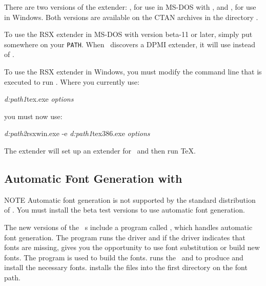 There are two versions of the extender: , for use in
MS-DOS with , and , for use in
Windows.  Both versions are available on the CTAN archives in the
directory .

To use the RSX extender in MS-DOS with 
version beta-11 or later, simply put  somewhere on
your \texttt{PATH}.  When \emTeX\ discovers a DPMI extender, it will
use  instead of .

\newpage
To use the RSX extender in Windows, you must modify the command line
that is executed to run .  Where you currently use:

\begin{ttindent}
\textit{d:{\bs}path1\bs}tex.exe \textit{options}
\end{ttindent}

you must now use:

\begin{ttindent}
\textit{d:{\bs}path2\bs}rsxwin.exe -e \textit{d:\bs path1\bs}tex386.exe \textit{options}
\end{ttindent}

The  extender will set up an extender for \emTeX\ and then
run \TeX.

\subsection{Automatic Font Generation with \protect\emTeX}
\label{sec:emtex:autofont}

\begin{note}{NOTE}
Automatic font generation is 
not supported by the standard distribution
of \emTeX.  You must install the beta test versions to use
automatic font generation.
\end{note}

The new versions of the \emTeX\ \dvidriver{}s include a program called
, which handles automatic font generation.  The
 program runs the driver and if the driver indicates
that fonts are missing, gives you the opportunity to use font substitution
or build new fonts.   The  program is used to build the
fonts.   runs the \MF\ and  to produce
and install the necessary fonts.   installs the  files
into the first directory on the font path.


